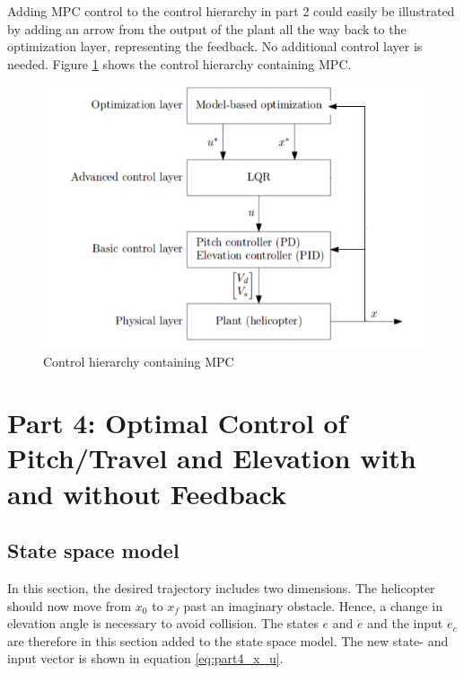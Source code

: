 \documentclass[a4paper, 12pt]{article}\usepackage[utf8]{inputenc}
\begin{document}
Adding MPC control to the control hierarchy in part 2 could easily be illustrated by adding an arrow from the output of the plant all the way back to the optimization layer, representing the feedback. No additional control layer is needed. Figure \ref{fig:chart_3.2} shows the control hierarchy containing MPC. \citep{Wikipedia}

\begin{figure}[H]
    \centering
    \includegraphics[width=140mm]{Part3/part32MPC.PNG}
    \caption{Control hierarchy containing MPC}
    \label{fig:chart_3.2}
\end{figure}


\section{Part 4: Optimal Control of Pitch/Travel and Elevation with
and without Feedback}


\subsection{State space model}
In this section, the desired trajectory includes two dimensions. The helicopter should now move from $x_0$ to $x_f$ past an imaginary obstacle. Hence, a change in elevation angle is necessary to avoid collision. The states $e$ and $\dot{e}$ and the input $e_c$ are therefore in this section added to the state space model. The new state- and input vector is shown in equation \ref{eq:part4_x_u}.
\end{document}
